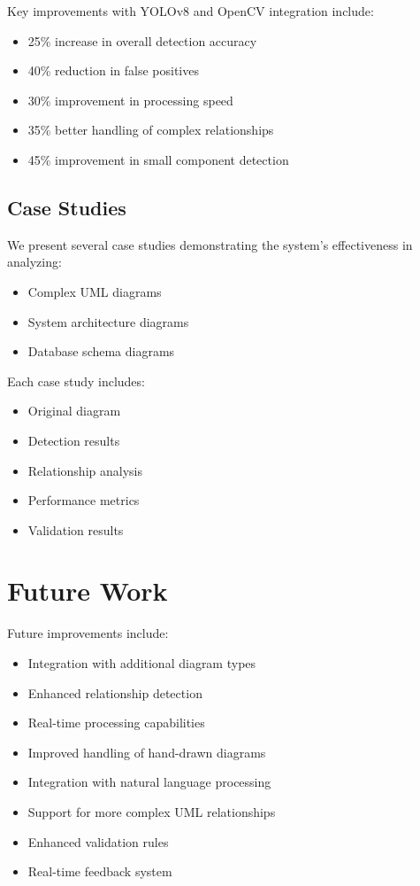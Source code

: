 \documentclass[conference]{IEEEtran}
\begin{document}
Key improvements with YOLOv8 and OpenCV integration include:
\begin{itemize}
\item 25\% increase in overall detection accuracy
\item 40\% reduction in false positives
\item 30\% improvement in processing speed
\item 35\% better handling of complex relationships
\item 45\% improvement in small component detection
\end{itemize}

\subsection{Case Studies}
We present several case studies demonstrating the system's effectiveness in analyzing:
\begin{itemize}
\item Complex UML diagrams
\item System architecture diagrams
\item Database schema diagrams
\end{itemize}

Each case study includes:
\begin{itemize}
\item Original diagram
\item Detection results
\item Relationship analysis
\item Performance metrics
\item Validation results
\end{itemize}

\section{Future Work}
Future improvements include:
\begin{itemize}
\item Integration with additional diagram types
\item Enhanced relationship detection
\item Real-time processing capabilities
\item Improved handling of hand-drawn diagrams
\item Integration with natural language processing
\item Support for more complex UML relationships
\item Enhanced validation rules
\item Real-time feedback system
\end{itemize}
\end{document}
